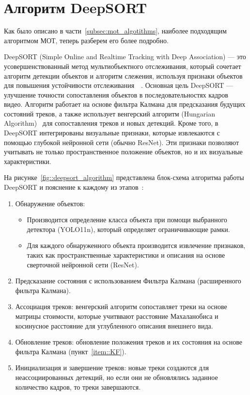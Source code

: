 \section{Алгоритм DeepSORT}

Как было описано в части~\ref{subsec:mot_algotithms}, наиболее подходящим алгоритмом МОТ, теперь разберем его более подробно.

DeepSORT (Simple Online and Realtime Tracking with Deep Association) — это усовершенствованный метод мультиобъектного отслеживания, который сочетает алгоритм детекции объектов и алгоритм слежения, используя признаки объектов для повышения устойчивости отслеживания~\cite{abellai2024object}~\cite{bewley2016simple}. Основная цель DeepSORT — улучшение точности сопоставления объектов в последовательностях кадров видео. Алгоритм работает на основе фильтра Калмана для предсказания будущих состояний треков, а также использует венгерский алгоритм (Hungarian Algorithm)~\cite{kuhn1955hungarian} для сопоставления треков и новых детекций. Кроме того, в DeepSORT интегрированы визуальные признаки, которые извлекаются с помощью глубокой нейронной сети (обычно ResNet). Эти признаки позволяют учитывать не только пространственное положение объектов, но и их визуальные характеристики.

На рисунке~\ref{fig::deepsort_algorithm} представлена блок-схема алгоритма работы DeepSORT и пояснение к каждому из этапов~\cite{IkomiaDeepSort2023}:


\begin{enumerate}
    \item Обнаружение объектов:
    \begin{itemize}
        \item Производится определение класса объекта при помощи выбранного детектора (YOLO11n), который определяет ограничивающие рамки.
        \item Для каждого обнаруженного объекта производится извлечение признаков, таких как пространственные характеристики и описания на основе сверточной нейронной сети (ResNet).
    \end{itemize} 
    \item \label{item::KF} Предсказание состояния с использованием Фильтра Калмана (расширенного фильтра Калмана).
    \item Ассоциация треков: венгерский алгоритм сопоставляет треки на основе матрицы стоимости, которые учитввают расстояние Махаланобиса и косинусное расстояние для углубленного описания внешнего вида.
    \item Обновление треков: обновление положения треков и их состояния на основе фильтра Калмана (пункт~\ref{item::KF}).
    \item Инициализация и завершение треков: новые треки создаются для неассоциированных детекций, но если они не обновлялись заданное количество кадров, то треки завершаются.
\end{enumerate}

